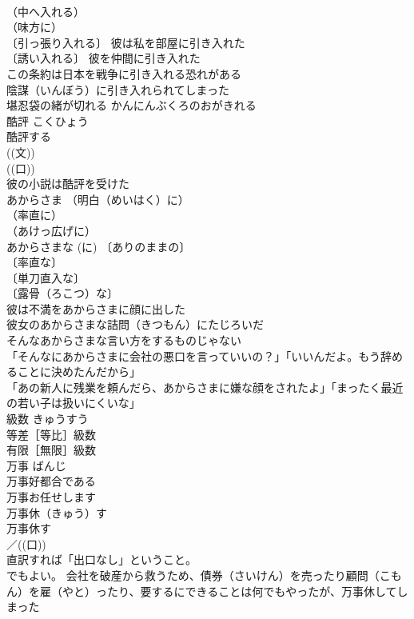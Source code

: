 \documentclass[8pt]{extreport}
\begin{document}
\begin{CJK}{UTF8}{min}
\\	（中へ入れる）
\\	（味方に）
\\	〔引っ張り入れる〕 彼は私を部屋に引き入れた 
\\	〔誘い入れる〕 彼を仲間に引き入れた 
\\	この条約は日本を戦争に引き入れる恐れがある 
\\	陰謀（いんぼう）に引き入れられてしまった 
\\	堪忍袋の緒が切れる	かんにんぶくろのおがきれる	
\\	酷評	こくひょう	
\\	酷評する 
\\	((文)) 
\\	((口)) 
\\	彼の小説は酷評を受けた 
\\	あからさま		（明白（めいはく）に）
\\	（率直に）
\\	（あけっ広げに）
\\	あからさまな (に) 〔ありのままの〕
\\	〔率直な〕
\\	〔単刀直入な〕
\\	〔露骨（ろこつ）な〕
\\	彼は不満をあからさまに顔に出した 
\\	彼女のあからさまな詰問（きつもん）にたじろいだ 
\\	そんなあからさまな言い方をするものじゃない 
\\	「そんなにあからさまに会社の悪口を言っていいの？」「いいんだよ。もう辞めることに決めたんだから」 
\\	「あの新人に残業を頼んだら、あからさまに嫌な顔をされたよ」「まったく最近の若い子は扱いにくいな」 
\\	級数	きゅうすう	
\\	等差［等比］級数 
\\	有限［無限］級数 
\\	万事	ばんじ	
\\	万事好都合である 
\\	万事お任せします 
\\	万事休（きゅう）す　
\\	万事休す 
\\	／((口)) 
\\	直訳すれば「出口なし」ということ。
\\	でもよい。 会社を破産から救うため、債券（さいけん）を売ったり顧問（こもん）を雇（やと）ったり、要するにできることは何でもやったが、万事休してしまった 

\end{CJK}
\end{document}
